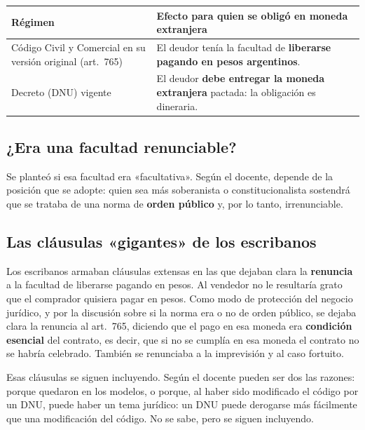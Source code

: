 \documentclass[12pt,oneside]{book}
\begin{document}
\begin{table}[H]
\centering
\begin{tabularx}{\textwidth}{
    >{\raggedright\arraybackslash}p{}
    >{\raggedright\arraybackslash}X
}
\toprule
\textbf{Régimen} & \textbf{Efecto para quien se obligó en moneda extranjera} \\
\midrule
Código Civil y Comercial en su versión original (art.~765) & El deudor tenía la facultad de \textbf{liberarse pagando en pesos argentinos}. \\
Decreto (DNU) vigente & El deudor \textbf{debe entregar la moneda extranjera} pactada: la obligación es dineraria. \\
\bottomrule
\end{tabularx}
\end{table}

\subsection{¿Era una facultad renunciable?}

Se planteó si esa facultad era «facultativa». Según el docente, depende de la posición que se adopte: quien sea más soberanista o constitucionalista sostendrá que se trataba de una norma de \textbf{orden público} y, por lo tanto, irrenunciable.

\subsection{Las cláusulas «gigantes» de los escribanos}

Los escribanos armaban cláusulas extensas en las que dejaban clara la \textbf{renuncia} a la facultad de liberarse pagando en pesos. Al vendedor no le resultaría grato que el comprador quisiera pagar en pesos. Como modo de protección del negocio jurídico, y por la discusión sobre si la norma era o no de orden público, se dejaba clara la renuncia al art.~765, diciendo que el pago en esa moneda era \textbf{condición esencial} del contrato, es decir, que si no se cumplía en esa moneda el contrato no se habría celebrado. También se renunciaba a la imprevisión y al caso fortuito.

Esas cláusulas se siguen incluyendo. Según el docente pueden ser dos las razones: porque quedaron en los modelos, o porque, al haber sido modificado el código por un DNU, puede haber un tema jurídico: un DNU puede derogarse más fácilmente que una modificación del código. No se sabe, pero se siguen incluyendo.
\end{document}
